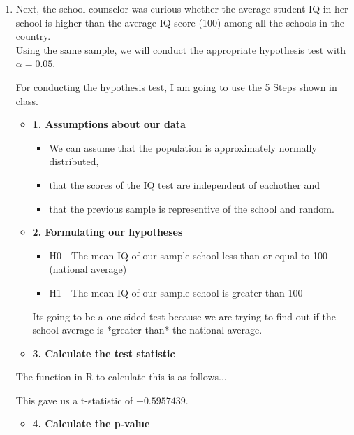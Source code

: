 \documentclass[12pt,letterpaper]{article}
\begin{document}
\begin{enumerate}
	\item Next, the school counselor was curious  whether  the average student IQ in her school is higher than the average IQ score (100) among all the schools in the country.\\ 
	
	Using the same sample, we will conduct the appropriate hypothesis test with $\alpha=0.05$.
	
	For conducting the hypothesis test, I am going to use the 5 Steps shown in class.
	
	\begin{itemize}
		\item  \textbf{1. Assumptions about our data}
		\begin{itemize}
			\item We can assume that the population is approximately normally distributed,
		    \item that the scores of the IQ test are independent of eachother and 
		    \item that the previous sample is representive of the school and random.
		\end{itemize}
	\end{itemize}
	
	\begin{itemize}
		\item \textbf{2. Formulating our hypotheses}
		\begin{itemize}
			\item H0 - The mean IQ of our sample school less than or equal to 100 (national average)
			\item H1 - The mean IQ of our sample school is greater than 100
		\end{itemize}
		Its going to be a one-sided test because we are trying to find out if the school average is *greater than* the national average.
	\end{itemize}
	
	\begin{itemize}
		\item \textbf{3. Calculate the test statistic}
	\end{itemize}
	
	The function in R to calculate this is as follows...
	
	
	This gave us a t-statistic of \(-0.5957439\).
	
	\begin{itemize}
		\item \textbf{4. Calculate the p-value}
	\end{itemize}
	

\end{enumerate}
\end{document}
